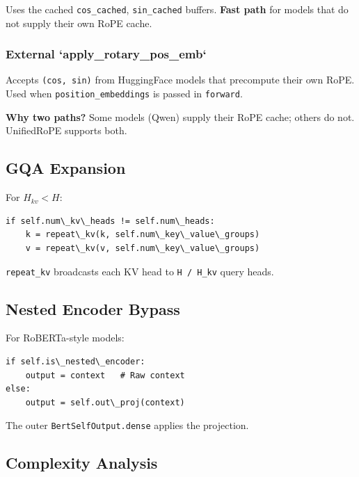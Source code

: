 Uses the cached \texttt{cos\_cached}, \texttt{sin\_cached} buffers. \textbf{Fast path} for models 
that do not supply their own RoPE cache.

\subsubsection{External `apply\_rotary\_pos\_emb`}

Accepts \texttt{(cos, sin)} from HuggingFace models that precompute their own 
RoPE. Used when \texttt{position\_embeddings} is passed in \texttt{forward}.

\textbf{Why two paths?} Some models (Qwen) supply their RoPE cache; others do 
not. UnifiedRoPE supports both.

\subsection{GQA Expansion}

For $H_{kv} < H$:

\begin{lstlisting}
if self.num\_kv\_heads != self.num\_heads:
    k = repeat\_kv(k, self.num\_key\_value\_groups)
    v = repeat\_kv(v, self.num\_key\_value\_groups)
\end{lstlisting}

\texttt{repeat\_kv} broadcasts each KV head to \texttt{H / H\_{kv}} query heads.

\subsection{Nested Encoder Bypass}

For RoBERTa-style models:

\begin{lstlisting}
if self.is\_nested\_encoder:
    output = context   # Raw context
else:
    output = self.out\_proj(context)
\end{lstlisting}

The outer \texttt{BertSelfOutput.dense} applies the projection.

\subsection{Complexity Analysis}

